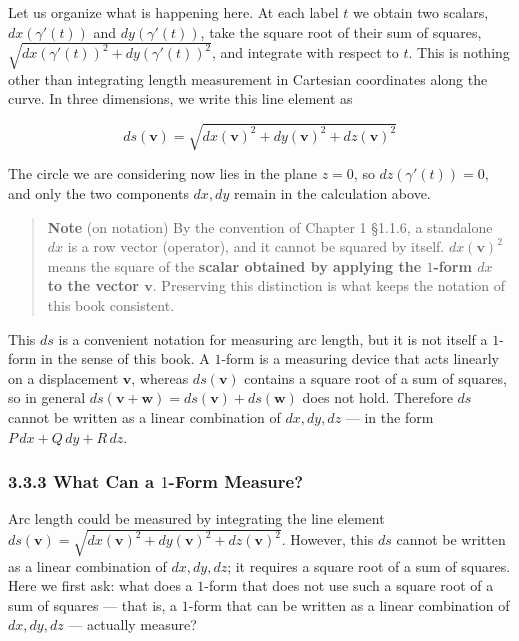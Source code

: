 Let us organize what is happening here. At each label \(t\) we obtain
two scalars, \(dx(\gamma'(t))\) and \(dy(\gamma'(t))\), take the square
root of their sum of squares,
\(\sqrt{dx(\gamma'(t))^2 + dy(\gamma'(t))^2}\), and integrate with
respect to \(t\). This is nothing other than integrating length
measurement in Cartesian coordinates along the curve. In three
dimensions, we write this line element as

\[ds(\mathbf{v}) = \sqrt{dx(\mathbf{v})^2 + dy(\mathbf{v})^2 + dz(\mathbf{v})^2}\]

The circle we are considering now lies in the plane \(z=0\), so
\(dz(\gamma'(t))=0\), and only the two components \(dx, dy\) remain in
the calculation above.

\begin{quote}
\textbf{Note} (on notation) By the convention of Chapter 1 §1.1.6, a
standalone \(dx\) is a row vector (operator), and it cannot be squared
by itself. \(dx(\mathbf{v})^2\) means the square of the
\textbf{scalar obtained by applying the $1$-form $dx$ to the vector $\mathbf{v}$}.
Preserving this distinction is what keeps the notation of this book
consistent.
\end{quote}

This \(ds\) is a convenient notation for measuring arc length, but it is
not itself a \(1\)-form in the sense of this book. A \(1\)-form is a
measuring device that acts linearly on a displacement \(\mathbf{v}\),
whereas \(ds(\mathbf{v})\) contains a square root of a sum of squares,
so in general
\(ds(\mathbf{v}+\mathbf{w}) = ds(\mathbf{v})+ds(\mathbf{w})\) does not
hold. Therefore \(ds\) cannot be written as a linear combination of
\(dx, dy, dz\) --- in the form \(P\,dx+Q\,dy+R\,dz\).

\hypertarget{what-can-a-1-form-measure}{%
\subsubsection{\texorpdfstring{3.3.3 What Can a \(1\)-Form
Measure?}{3.3.3 What Can a 1-Form Measure?}}\label{what-can-a-1-form-measure}}

Arc length could be measured by integrating the line element
\(ds(\mathbf{v}) = \sqrt{dx(\mathbf{v})^2 + dy(\mathbf{v})^2 + dz(\mathbf{v})^2}\).
However, this \(ds\) cannot be written as a linear combination of
\(dx, dy, dz\); it requires a square root of a sum of squares. Here we
first ask: what does a \(1\)-form that does not use such a square root
of a sum of squares --- that is, a \(1\)-form that can be written as a
linear combination of \(dx, dy, dz\) --- actually measure?

